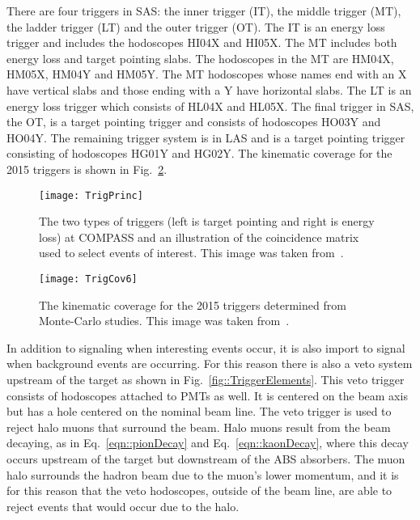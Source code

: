 There are four triggers in SAS: the inner trigger (IT), the middle trigger (MT),
the ladder trigger (LT) and the outer trigger (OT).  The IT is an energy loss
trigger and includes the hodoscopes HI04X and HI05X.  The MT includes both
energy loss and target pointing slabs.  The hodoscopes in the MT are HM04X,
HM05X, HM04Y and HM05Y.  The MT hodoscopes whose names end with an X have
vertical slabs and those ending with a Y have horizontal slabs.  The LT is an
energy loss trigger which consists of HL04X and HL05X.  The final trigger in
SAS, the OT, is a target pointing trigger and consists of hodoscopes HO03Y and
HO04Y.  The remaining trigger system is in LAS and is a target pointing trigger
consisting of hodoscopes HG01Y and HG02Y.  The kinematic coverage for the 2015
triggers is shown in Fig.~\ref{fig::TrigCov6}. \par

\begin{figure}[h!t]
  \centering
  \texttt{[image: TrigPrinc]}
  \caption{The two types of triggers (left is target pointing and right is
    energy loss) at COMPASS and an illustration of the coincidence matrix used
    to select events of interest.  This image was taken from~\cite{trigDefs}.}
  \label{fig::TrigPrinc}
\end{figure}

\begin{figure}[h!t]
  \centering
  \texttt{[image: TrigCov6]}
  \caption{The kinematic coverage for the 2015 triggers determined from
    Monte-Carlo studies.  This image was taken from~\cite{longothesis}.}
  \label{fig::TrigCov6}
\end{figure}

In addition to signaling when interesting events occur, it is also import to
signal when background events are occurring.  For this reason there is also a
veto system upstream of the target as shown in Fig.~\ref{fig::TriggerElements}.
This veto trigger consists of hodoscopes attached to PMTs as well.  It is
centered on the beam axis but has a hole centered on the nominal beam line.  The
veto trigger is used to reject halo muons that surround the beam.  Halo muons
result from the beam decaying, as in Eq.~\ref{eqn::pionDecay} and
Eq.~\ref{eqn::kaonDecay}, where this decay occurs upstream of the target but
downstream of the ABS absorbers.  The muon halo surrounds the hadron beam due to
the muon's lower momentum, and it is for this reason that the veto hodoscopes,
outside of the beam line, are able to reject events that would occur due to the
halo.

